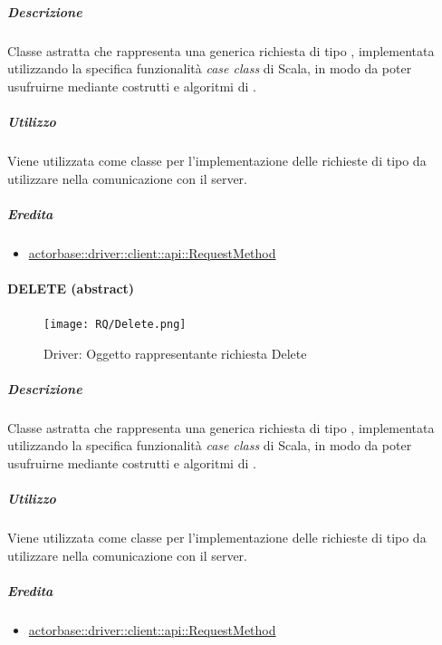 \documentclass{scalatekids-article}
\begin{document}
\subparagraph{Descrizione}

Classe astratta che rappresenta una generica richiesta  di tipo
, implementata utilizzando la specifica funzionalità \textit{case
  class} di Scala, in modo da poter usufruirne mediante costrutti e algoritmi di
.

\subparagraph{Utilizzo}

Viene utilizzata come classe per l'implementazione delle richieste 
di tipo  da utilizzare nella comunicazione con il server.

\subparagraph{Eredita}

\begin{itemize}
\item \hyperref[sec:actorbase::driver::client::api::RequestMethod]{actorbase::driver::client::api::RequestMethod}
\end{itemize}


\paragraph{DELETE (abstract)}
\label{sec:actorbase::driver::client::api::DELETE}

\begin{figure}[H]
  \begin{center}
    \texttt{[image: RQ/Delete.png]}
    \caption{Driver: Oggetto rappresentante richiesta Delete}
  \end{center}
\end{figure}

\subparagraph{Descrizione}

Classe astratta che rappresenta una generica richiesta  di tipo
, implementata utilizzando la specifica funzionalità \textit{case
  class} di Scala, in modo da poter usufruirne mediante costrutti e algoritmi di
.

\subparagraph{Utilizzo}

Viene utilizzata come classe per l'implementazione delle richieste 
di tipo  da utilizzare nella comunicazione con il server.

\subparagraph{Eredita}

\begin{itemize}
\item \hyperref[sec:actorbase::driver::client::api::RequestMethod]{actorbase::driver::client::api::RequestMethod}
\end{itemize}
\end{document}
